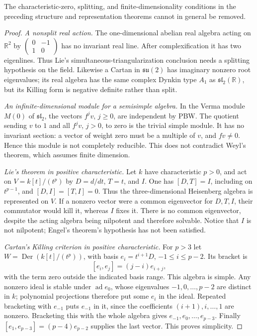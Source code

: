 \begin{proposition}
\label{res:J09}
The characteristic-zero, splitting, and finite-dimensionality
conditions in the preceding structure and representation
theorems cannot in general be removed.
\end{proposition}
\begin{proof}
\emph{A nonsplit real action.}
The one-dimensional abelian real algebra acting on
\(\mathbb R^2\) by
\(\left(\begin{smallmatrix}0&-1\\1&0\end{smallmatrix}\right)\)
has no invariant real line. After complexification it
has two eigenlines. Thus Lie's simultaneous-triangularization
conclusion needs a splitting hypothesis on the field.
Likewise a Cartan in \(\mathfrak{su}(2)\) has imaginary
nonzero root eigenvalues; its real algebra has the same
complex Dynkin type \(A_1\) as
\(\mathfrak{sl}_2(\mathbb R)\), but its Killing form is
negative definite rather than split.

\emph{An infinite-dimensional module for a semisimple algebra.}
In the Verma module \(M(0)\) of \(\mathfrak{sl}_2\), the
vectors \(f^jv\), \(j\geq0\), are independent by PBW.
The quotient sending \(v\) to \(1\) and all \(f^jv\),
\(j>0\), to zero is the trivial simple module.
It has no invariant section: a vector of weight zero
must be a multiple of \(v\), and \(fv\ne0\).
Hence this module is not completely reducible.
This does not contradict Weyl's theorem, which assumes
finite dimension.

\emph{Lie's theorem in positive characteristic.}
Let \(k\) have characteristic \(p>0\), and act on
\(V=k[t]/(t^p)\) by \(D=d/dt\), \(T=t\), and \(I\).
One has \([D,T]=I\), including on \(t^{p-1}\), and
\([D,I]=[T,I]=0\). Thus the three-dimensional
Heisenberg algebra is represented on \(V\).
If a nonzero vector were a common eigenvector for
\(D,T,I\), their commutator would kill it, whereas
\(I\) fixes it. There is no common eigenvector,
despite the acting algebra being nilpotent and
therefore solvable. Notice that \(I\) is not
nilpotent; Engel's theorem's hypothesis has not
been satisfied.

\emph{Cartan's Killing criterion in positive characteristic.}
For \(p>3\) let
\(W=\operatorname{Der}(k[t]/(t^p))\), with basis
\(e_i=t^{i+1}D\), \(-1\leq i\leq p-2\).
Its bracket is
\[
 [e_i,e_j]=(j-i)e_{i+j},
\]
with the term zero outside the indicated basis range.
This algebra is simple. Any nonzero ideal is stable
under \(\operatorname{ad}e_0\), whose eigenvalues
\(-1,0,\ldots,p-2\) are distinct in \(k\);
polynomial projections therefore put some \(e_i\)
in the ideal. Repeated bracketing with \(e_{-1}\)
puts \(e_{-1}\) in it, since the coefficients
\((i+1),i,\ldots,1\) are nonzero. Bracketing this
with the whole algebra gives
\(e_{-1},e_0,\ldots,e_{p-3}\). Finally
\([e_1,e_{p-3}]=(p-4)e_{p-2}\) supplies the last
vector. This proves simplicity.


\end{proof}

